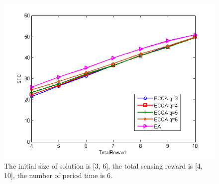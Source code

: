 \documentclass[journal]{IEEEtran}
\begin{document}
\begin{figure}
	\centering
	\includegraphics[width=1\linewidth]{Fig4(e).png}
	\caption{The initial size of solution is [3, 6], the total sensing reward is [4, 10], the number of period time is 6.}
	\label{fig:figure6}
\end{figure}
\end{document}
